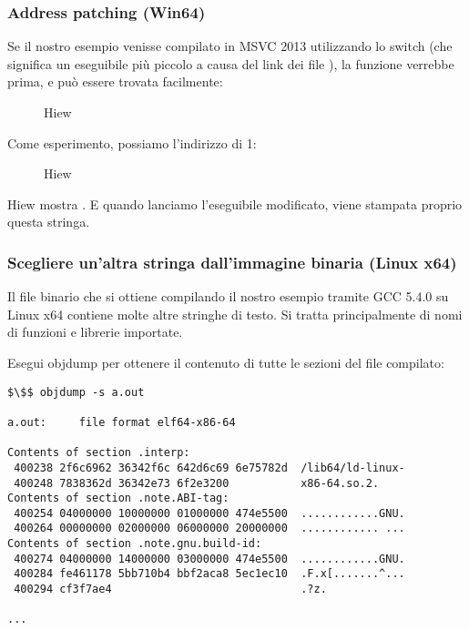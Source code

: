 \subsubsection{Address patching (Win64)}

Se il nostro esempio venisse compilato in MSVC 2013 utilizzando lo switch 
(che significa un eseguibile più piccolo a causa del link dei file ), la funzione \main verrebbe prima, e può essere trovata facilmente:

\begin{figure}[H]
\centering
{}
\caption{Hiew}
\label{}
\end{figure}

Come esperimento, possiamo  l'indirizzo di 1:

\begin{figure}[H]
\centering
{}
\caption{Hiew}
\label{}
\end{figure}

Hiew mostra .
E quando lanciamo l'eseguibile modificato, viene stampata proprio questa stringa.

\subsubsection{Scegliere un'altra stringa dall'immagine binaria (Linux x64)}

Il file binario che si ottiene compilando il nostro esempio tramite GCC 5.4.0 su Linux x64 contiene molte altre stringhe di testo.
Si tratta principalmente di nomi di funzioni e librerie importate.

Esegui objdump per ottenere il contenuto di tutte le sezioni del file compilato:

\begin{lstlisting}[basicstyle=\ttfamily, mathescape]
$\$$ objdump -s a.out

a.out:     file format elf64-x86-64

Contents of section .interp:
 400238 2f6c6962 36342f6c 642d6c69 6e75782d  /lib64/ld-linux-
 400248 7838362d 36342e73 6f2e3200           x86-64.so.2.
Contents of section .note.ABI-tag:
 400254 04000000 10000000 01000000 474e5500  ............GNU.
 400264 00000000 02000000 06000000 20000000  ............ ...
Contents of section .note.gnu.build-id:
 400274 04000000 14000000 03000000 474e5500  ............GNU.
 400284 fe461178 5bb710b4 bbf2aca8 5ec1ec10  .F.x[.......^...
 400294 cf3f7ae4                             .?z.

...
\end{lstlisting}

